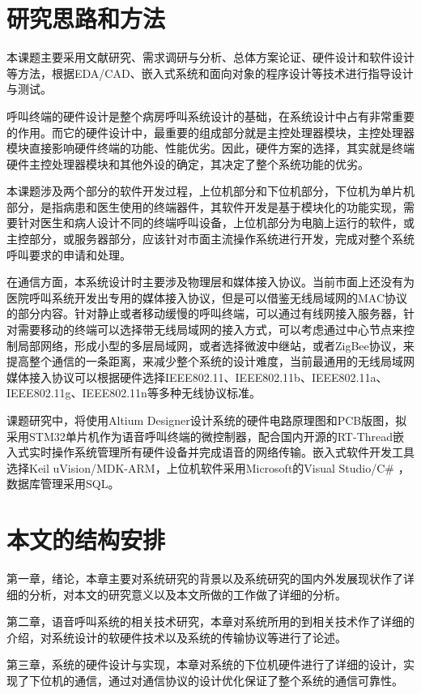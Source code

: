 \section{研究思路和方法}
本课题主要采用文献研究、需求调研与分析、总体方案论证、硬件设计和软件设计等方法，根据EDA/CAD、嵌入式系统和面向对象的程序设计等技术进行指导设计与测试。

呼叫终端的硬件设计是整个病房呼叫系统设计的基础，在系统设计中占有非常重要的作用。而它的硬件设计中，最重要的组成部分就是主控处理器模块，主控处理器模块直接影响硬件终端的功能、性能优劣。因此，硬件方案的选择，其实就是终端硬件主控处理器模块和其他外设的确定，其决定了整个系统功能的优劣。

本课题涉及两个部分的软件开发过程，上位机部分和下位机部分，下位机为单片机部分，是指病患和医生使用的终端器件，其软件开发是基于模块化的功能实现，需要针对医生和病人设计不同的终端呼叫设备，上位机部分为电脑上运行的软件，或主控部分，或服务器部分，应该针对市面主流操作系统进行开发，完成对整个系统呼叫要求的申请和处理。

在通信方面，本系统设计时主要涉及物理层和媒体接入协议。当前市面上还没有为医院呼叫系统开发出专用的媒体接入协议，但是可以借鉴无线局域网的MAC协议的部分内容。针对静止或者移动缓慢的呼叫终端，可以通过有线网接入服务器，针对需要移动的终端可以选择带无线局域网的接入方式，可以考虑通过中心节点来控制局部网络，形成小型的多层局域网，或者选择微波中继站，或者ZigBee协议，来提高整个通信的一条距离，来减少整个系统的设计难度，当前最通用的无线局域网媒体接入协议可以根据硬件选择IEEE802.11、IEEE802.11b、IEEE802.11a、IEEE802.11g、IEEE802.11n等多种无线协议标准。

课题研究中，将使用Altium Designer设计系统的硬件电路原理图和PCB版图，拟采用STM32单片机作为语音呼叫终端的微控制器，配合国内开源的RT-Thread嵌入式实时操作系统管理所有硬件设备并完成语音的网络传输。嵌入式软件开发工具选择Keil uVision/MDK-ARM，上位机软件采用Microsoft的Visual Studio/C\# ，数据库管理采用SQL。

\section{本文的结构安排}
第一章，绪论，本章主要对系统研究的背景以及系统研究的国内外发展现状作了详细的分析，对本文的研究意义以及本文所做的工作做了详细的分析。

第二章，语音呼叫系统的相关技术研究，本章对系统所用的到相关技术作了详细的介绍，对系统设计的软硬件技术以及系统的传输协议等进行了论述。

第三章，系统的硬件设计与实现，本章对系统的下位机硬件进行了详细的设计，实现了下位机的通信，通过对通信协议的设计优化保证了整个系统的通信可靠性。

